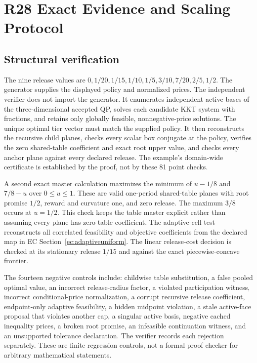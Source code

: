 \section{R28 Exact Evidence and Scaling Protocol}\label{ec:r28-evidence}
\subsection{Structural verification}
The nine release values are $0,1/20,1/15,1/10,1/5,3/10,7/20,2/5,1/2$. The generator supplies the displayed policy and normalized prices. The independent verifier does not import the generator. It enumerates independent active bases of the three-dimensional accepted QP, solves each candidate KKT system with fractions, and retains only globally feasible, nonnegative-price solutions. The unique optimal tier vector must match the supplied policy. It then reconstructs the recursive child planes, checks every scalar box conjugate at the policy, verifies the zero shared-table coefficient and exact root upper value, and checks every anchor plane against every declared release. The example's domain-wide certificate is established by the proof, not by these 81 point checks.

A second exact master calculation maximizes the minimum of $u-1/8$ and $7/8-u$ over $0\leq u\leq1$. These are valid one-period shared-table planes with root promise $1/2$, reward and curvature one, and zero release. The maximum $3/8$ occurs at $u=1/2$. This check keeps the table master explicit rather than assuming every plane has zero table coefficient. The adaptive-cell test reconstructs all correlated feasibility and objective coefficients from the declared map in EC Section~\ref{ec:adaptiveuniform}. The linear release-cost decision is checked at its stationary release $1/15$ and against the exact piecewise-concave frontier.

The fourteen negative controls include: childwise table substitution, a false pooled optimal value, an incorrect release-radius factor, a violated participation witness, incorrect conditional-price normalization, a corrupt recursive release coefficient, endpoint-only adaptive feasibility, a hidden midpoint violation, a stale active-face proposal that violates another cap, a singular active basis, negative cached inequality prices, a broken root promise, an infeasible continuation witness, and an unsupported tolerance declaration. The verifier records each rejection separately. These are finite regression controls, not a formal proof checker for arbitrary mathematical statements.

